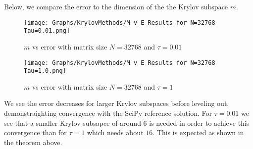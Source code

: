 Below, we compare the error to the dimension of the the Krylov subspace $m$.
\begin{figure}[H]
    \centering
    \begin{minipage}{0.49\textwidth}
        \texttt{[image: Graphs/KrylovMethods/M v E Results for N=32768 Tau=0.01.png]} %
        \caption{$m$ vs error with matrix size $N=32768$ and $\tau = 0.01$}
        \label{fig:mEKrylov1}
    \end{minipage}\hfill
    \centering
    \begin{minipage}{0.49\textwidth}
        \texttt{[image: Graphs/KrylovMethods/M v E Results for N=32768 Tau=1.0.png]} %
        \caption{$m$ vs error with matrix size $N=32768$ and $\tau = 1$}
        \label{fig:mEKrylov2}
    \end{minipage}\hfill
\end{figure}
We see the error decreases for larger Krylov subspaces before leveling out, demonstraighting convergence with the SciPy reference solution.
For $\tau = 0.01$ we see that a smaller Krylov subsapce of around $6$ is needed in order to achieve this convergence than for $\tau = 1$ which needs about $16$.
This is expected as shown in the theorem above.

